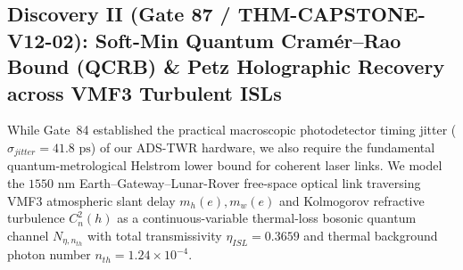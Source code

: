 \documentclass[11pt,a4paper,reqno]{article}
\def\texttt#1{#1}%
\def\mathrm#1{#1}%
\def\mathcal#1{#1}%
\theoremstyle{plain}
\theoremstyle{definition}
\theoremstyle{remark}
\numberwithin{equation}{section}
\begin{document}
\subsection{\texorpdfstring{Discovery II (\texttt{Gate 87 / THM-CAPSTONE-V12-02}): Soft-Min Quantum Cram\'{e}r--Rao Bound (QCRB) \& Petz Holographic Recovery across VMF3 Turbulent ISLs}{Discovery II (Gate 87 / THM-CAPSTONE-V12-02): Soft-Min Quantum Cramer-Rao Bound (QCRB) and Petz Holographic Recovery across VMF3 Turbulent ISLs}}
While Gate~84 established the practical macroscopic photodetector timing jitter ($\sigma_{\mathrm{jitter}} = 41.8\text{ ps}$) of our ADS-TWR hardware, we also require the fundamental quantum-metrological Helstrom lower bound for coherent laser links. We model the $1550\text{ nm}$ Earth--Gateway--Lunar-Rover free-space optical link traversing VMF3 atmospheric slant delay $m_h(e), m_w(e)$ and Kolmogorov refractive turbulence $C_n^2(h)$ as a continuous-variable thermal-loss bosonic quantum channel $\mathcal{N}_{\eta,n_{\mathrm{th}}}$ with total transmissivity $\eta_{\mathrm{ISL}} = 0.3659$ and thermal background photon number $n_{\mathrm{th}} = 1.24 \times 10^{-4}$.
\end{document}
